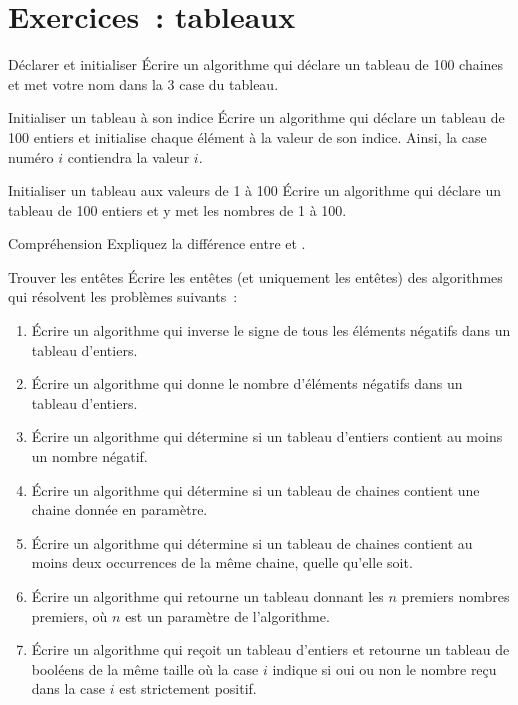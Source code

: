 \clearpage
\section{Exercices~: tableaux}
\bigskip 


	\begin{Exercice}{Déclarer et initialiser}
		Écrire un algorithme qui déclare un tableau de 100 chaines
		et met votre nom dans la 3\ieme{} case du tableau.
	\end{Exercice}

	\begin{Exercice}{Initialiser un tableau à son indice}
		Écrire un algorithme qui déclare un tableau de 100 entiers
		et initialise chaque élément à la valeur de son indice.
		Ainsi, la case numéro $i$ contiendra la valeur $i$.
	\end{Exercice}

	\begin{Exercice}{Initialiser un tableau aux valeurs de 1 à 100}
		Écrire un algorithme qui déclare un tableau de 100 entiers
		et y met les nombres de 1 à 100.
	\end{Exercice}

	\begin{Exercice}{Compréhension}
		Expliquez la différence entre 
		et .
	\end{Exercice}



	\begin{Exercice}{Trouver les entêtes}
		Écrire les entêtes (et uniquement les entêtes)
		des algorithmes qui résolvent les problèmes suivants~:
		\begin{enumerate}[label=\alph*)]
			\item
				Écrire un algorithme qui 
				inverse le signe de tous les éléments négatifs dans un tableau d’entiers.
			\item
				Écrire un algorithme qui
				donne le nombre d’éléments négatifs dans un tableau d’entiers.
			\item
				Écrire un algorithme qui
				détermine si un tableau d’entiers contient au moins un nombre négatif.
			\item
				Écrire un algorithme qui
				détermine si un tableau de chaines contient
				une chaine donnée en paramètre.
			\item
				Écrire un algorithme qui
				détermine si un tableau de chaines contient
				au moins deux occurrences de la même chaine,
				quelle qu’elle soit.
			\item
				Écrire un algorithme qui 
				retourne un tableau donnant les $n$ premiers nombres premiers,
				où $n$ est un paramètre de l’algorithme.
			\item
				Écrire un algorithme qui 
				reçoit un tableau d’entiers
				et retourne un tableau de booléens de la même taille
				où la case $i$ indique si oui ou non
				le nombre reçu dans la case $i$ est strictement positif.
		\end{enumerate}
	\end{Exercice}


